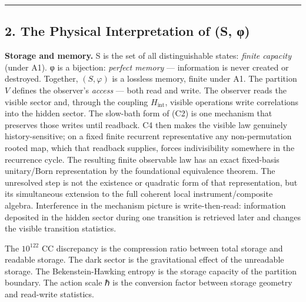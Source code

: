 \documentclass[
]{article}
\begin{document}
\begin{center}\rule{0.5\linewidth}{0.5pt}\end{center}

\hypertarget{the-physical-interpretation-of-s-ux3c6}{%
\subsection{2. The Physical Interpretation of (S,
φ)}\label{the-physical-interpretation-of-s-ux3c6}}

\textbf{Storage and memory.} S is the set of all distinguishable states:
\emph{finite capacity} (under A1). φ is a bijection: \emph{perfect
memory} --- information is never created or destroyed. Together,
\((S,\varphi)\) is a lossless memory, finite under A1. The partition
\(V\) defines the observer's \emph{access} --- both read and write. The
observer reads the visible sector and, through the coupling
\(H_{\text{int}}\), visible operations write correlations into the
hidden sector. The slow-bath form of (C2) is one mechanism that
preserves those writes until readback. C4 then makes the visible law
genuinely history-sensitive; on a fixed finite recurrent representative
any non-permutation rooted map, which that readback supplies, forces
indivisibility somewhere in the recurrence cycle. The resulting finite
observable law has an exact fixed-basis unitary/Born representation by
the foundational equivalence theorem. The unresolved step is not the
existence or quadratic form of that representation, but its simultaneous
extension to the full coherent local instrument/composite algebra.
Interference in the mechanism picture is write-then-read: information
deposited in the hidden sector during one transition is retrieved later
and changes the visible transition statistics.

The \(10^{122}\) CC discrepancy is the compression ratio between total
storage and readable storage. The dark sector is the gravitational
effect of the unreadable storage. The Bekenstein-Hawking entropy is the
storage capacity of the partition boundary. The action scale ℏ is the
conversion factor between storage geometry and read-write statistics.
\end{document}
